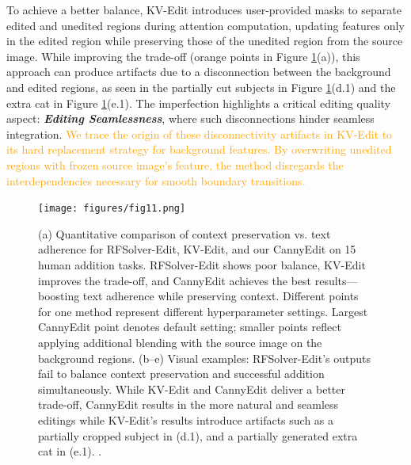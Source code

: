 \documentclass{article}
\begin{document}
To achieve a better balance, KV-Edit \citep{zhu2025kv} introduces user-provided masks to separate edited and unedited regions during attention computation, updating features only in the edited region while preserving those of the unedited region from the source image. While improving the trade-off (orange points in Figure \ref{fig2}(a)), this approach can produce artifacts due to a disconnection between the background and edited regions, as seen in the partially cut subjects in Figure \ref{fig2}(d.1) and the extra cat in Figure \ref{fig2}(e.1). The imperfection highlights a critical editing quality aspect: \textbf{\textit{Editing Seamlessness}}, where such disconnections hinder seamless integration. \textcolor{orange}{We trace the origin of these disconnectivity artifacts in KV-Edit to its hard replacement strategy for background features. By overwriting unedited regions with frozen source image's feature, the method disregards the interdependencies necessary for smooth boundary transitions.}


\begin{figure}[t]
    \centering
    \texttt{[image: figures/fig11.png]}
  \caption{(a) Quantitative comparison of context preservation vs. text adherence for RFSolver-Edit, KV-Edit, and our CannyEdit on 15 human addition tasks. RFSolver-Edit shows poor balance, KV-Edit improves the trade-off, and CannyEdit achieves the best results—boosting text adherence while preserving context. Different points for one method represent different hyperparameter settings. Largest CannyEdit point denotes default setting; smaller points reflect applying additional blending with the source image on the background regions. (b–e) Visual examples: RFSolver-Edit's outputs fail to balance context preservation and successful addition simultaneously. While KV-Edit and CannyEdit deliver a better trade-off, CannyEdit results in the more natural and seamless editings while KV-Edit's results introduce artifacts such as a {partially cropped subject} in (d.1), and {a partially generated extra cat} in (e.1). .}
    \label{fig2}
\end{figure}
\end{document}
